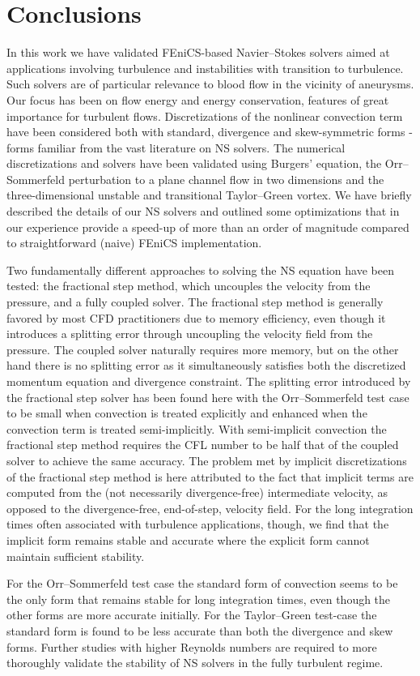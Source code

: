 \section{Conclusions}

In this work we have validated FEniCS-based Navier--Stokes solvers
aimed at applications involving turbulence and instabilities with
transition to turbulence. Such solvers are of particular relevance
to blood flow in the vicinity of aneurysms.  Our focus has been on
flow energy and energy conservation, features of great importance for
turbulent flows. Discretizations of the nonlinear convection term have
been considered both with standard, divergence and skew-symmetric forms
- forms familiar from the vast literature on NS solvers. The numerical
discretizations and solvers have been validated using Burgers' equation,
the Orr--Sommerfeld perturbation to a plane channel flow in two dimensions
and the three-dimensional unstable and transitional Taylor--Green
vortex. We have briefly described the details of our NS solvers and
outlined some optimizations that in our experience provide a speed-up
of more than an order of magnitude compared to straightforward (naive)
FEniCS implementation.

Two fundamentally different approaches to solving the NS equation have
been tested: the fractional step method, which uncouples the velocity from
the pressure, and a fully coupled solver. The fractional step method is
generally favored by most CFD practitioners due to memory efficiency,
even though it introduces a splitting error through uncoupling the
velocity field from the pressure. The coupled solver naturally requires
more memory, but on the other hand there is no splitting error as it
simultaneously satisfies both the discretized momentum equation and
divergence constraint.  The splitting error introduced by the fractional
step solver has been found here with the Orr--Sommerfeld test case to
be small when convection is treated explicitly and enhanced when the
convection term is treated semi-implicitly. With semi-implicit convection
the fractional step method requires the CFL number to be half that of
the coupled solver to achieve the same accuracy. The problem met by
implicit discretizations of the fractional step method
is here attributed to the fact that implicit terms are computed from the
(not necessarily divergence-free) intermediate velocity, as opposed to
the divergence-free, end-of-step, velocity field.
For the long integration times often associated with turbulence
applications, though, we find that the implicit form remains stable and
accurate where the explicit form cannot maintain sufficient stability.

For the Orr--Sommerfeld test case the standard form of convection seems
to be the only form that remains stable for long integration times, even
though the other forms are more accurate initially. For the Taylor--Green
test-case the standard form is found to be less accurate than both the
divergence and skew forms. Further studies with higher Reynolds numbers
are required to more thoroughly validate the stability of NS solvers in
the fully turbulent regime.
